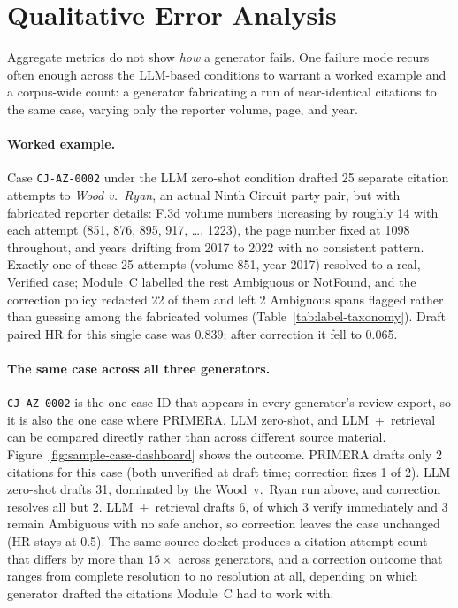 \section{Qualitative Error Analysis}
\label{sec:results-qualitative}

Aggregate metrics do not show \emph{how} a generator fails. One failure mode recurs often enough across the LLM-based conditions to warrant a worked example and a corpus-wide count: a generator fabricating a run of near-identical citations to the same case, varying only the reporter volume, page, and year.

\paragraph{Worked example.} Case \texttt{CJ-AZ-0002} under the LLM zero-shot condition drafted 25 separate citation attempts to \emph{Wood v.\ Ryan}, an actual Ninth Circuit party pair, but with fabricated reporter details: F.3d volume numbers increasing by roughly 14 with each attempt (851, 876, 895, 917, \ldots, 1223), the page number fixed at 1098 throughout, and years drifting from 2017 to 2022 with no consistent pattern. Exactly one of these 25 attempts (volume 851, year 2017) resolved to a real, Verified case; Module~C labelled the rest Ambiguous or NotFound, and the correction policy redacted 22 of them and left 2 Ambiguous spans flagged rather than guessing among the fabricated volumes (Table~\ref{tab:label-taxonomy}). Draft paired HR for this single case was 0.839; after correction it fell to 0.065.

\paragraph{The same case across all three generators.} \texttt{CJ-AZ-0002} is the one case ID that appears in every generator's review export, so it is also the one case where PRIMERA, LLM zero-shot, and LLM~+~retrieval can be compared directly rather than across different source material. Figure~\ref{fig:sample-case-dashboard} shows the outcome. PRIMERA drafts only 2 citations for this case (both unverified at draft time; correction fixes 1 of 2). LLM zero-shot drafts 31, dominated by the Wood~v.\ Ryan run above, and correction resolves all but 2. LLM~+~retrieval drafts 6, of which 3 verify immediately and 3 remain Ambiguous with no safe anchor, so correction leaves the case unchanged (HR stays at 0.5). The same source docket produces a citation-attempt count that differs by more than $15\times$ across generators, and a correction outcome that ranges from complete resolution to no resolution at all, depending on which generator drafted the citations Module~C had to work with.

